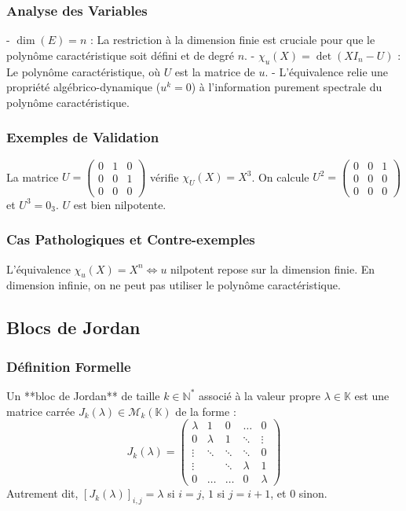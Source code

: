\documentclass[11pt,a4paper]{article}
\begin{document}
\subsubsection{Analyse des Variables}
- $\dim(E) = n$ : La restriction à la dimension finie est cruciale pour que le polynôme caractéristique soit défini et de degré $n$.
- $\chi_u(X) = \det(XI_n - U)$ : Le polynôme caractéristique, où $U$ est la matrice de $u$.
- L'équivalence relie une propriété algébrico-dynamique ($u^k = 0$) à l'information purement spectrale du polynôme caractéristique.

\subsubsection{Exemples de Validation}
La matrice $U = \begin{pmatrix} 0 & 1 & 0 \\ 0 & 0 & 1 \\ 0 & 0 & 0 \end{pmatrix}$ vérifie $\chi_U(X) = X^3$. On calcule $U^2 = \begin{pmatrix} 0 & 0 & 1 \\ 0 & 0 & 0 \\ 0 & 0 & 0 \end{pmatrix}$ et $U^3 = 0_3$. $U$ est bien nilpotente.

\subsubsection{Cas Pathologiques et Contre-exemples}
L'équivalence $\chi_u(X) = X^n \iff u$ nilpotent repose sur la dimension finie. En dimension infinie, on ne peut pas utiliser le polynôme caractéristique.

\subsection{Blocs de Jordan}

\subsubsection{Définition Formelle}
Un **bloc de Jordan** de taille $k \in \mathbb{N}^*$ associé à la valeur propre $\lambda \in \mathbb{K}$ est une matrice carrée $J_k(\lambda) \in \mathcal{M}_k(\mathbb{K})$ de la forme :
$$ J_k(\lambda) = \begin{pmatrix} \lambda & 1 & 0 & \dots & 0 \\ 0 & \lambda & 1 & \ddots & \vdots \\ \vdots & \ddots & \ddots & \ddots & 0 \\ \vdots & & \ddots & \lambda & 1 \\ 0 & \dots & \dots & 0 & \lambda \end{pmatrix} $$
Autrement dit, $[J_k(\lambda)]_{i,j} = \lambda$ si $i=j$, $1$ si $j = i+1$, et $0$ sinon.
\end{document}
